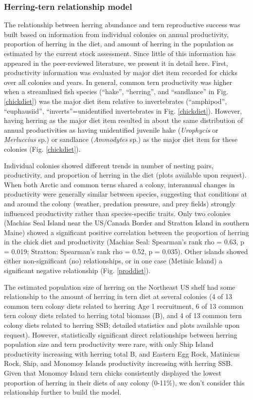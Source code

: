 \documentclass[]{article}
\begin{document}
\subsubsection{Herring-tern relationship
model}\label{herring-tern-relationship-model}

The relationship between herring abundance and tern reproductive success
was built based on information from individual colonies on annual
productivity, proportion of herring in the diet, and amount of herring
in the population as estimated by the current stock assessment. Since
little of this information has appeared in the peer-reviewed literature,
we present it in detail here. First, productivity information was
evaluated by major diet item recorded for chicks over all colonies and
years. In general, common tern productivity was higher when a
streamlined fish species (``hake'', ``herring'', and ``sandlance'' in
Fig. \ref{chickdiet}) was the major diet item relative to invertebrates
(``amphipod'', ``euphausiid'', ``inverts''=unidentified invertebrates in
Fig. \ref{chickdiet}). However, having herring as the major diet item
resulted in about the same distribution of annual productivities as
having unidentified juvenile hake (\emph{Urophycis} or \emph{Merluccius}
sp.) or sandlance (\emph{Ammodytes} sp.) as the major diet item for
these colonies (Fig. \ref{chickdiet}).

Individual colonies showed different trends in number of nesting pairs,
productivity, and proportion of herring in the diet (plots available
upon request). When both Arctic and common terns shared a colony,
interannual changes in productivity were generally similar between
species, suggesting that conditions at and around the colony (weather,
predation pressure, and prey fields) strongly influenced productivity
rather than species-specific traits. Only two colonies (Machias Seal
Island near the US/Canada Border and Stratton Island in southern Maine)
showed a significant positive correlation between the proportion of
herring in the chick diet and productivity (Machias Seal: Spearman's
rank rho = 0.63, p = 0.019; Stratton: Spearman's rank rho = 0.52, p =
0.035). Other islands showed either non-significant (no) relationships,
or in one case (Metinic Island) a significant negative relationship
(Fig. \ref{proddiet}).

The estimated population size of herring on the Northeast US shelf had
some relationship to the amount of herring in tern diet at several
colonies (4 of 13 common tern colony diets related to herring Age 1
recruitment, 6 of 13 common tern colony diets related to herring total
biomass (B), and 4 of 13 common tern colony diets related to herring
SSB; detailed statistics and plots available upon request). However,
statistically significant direct relationships between herring
population size and tern productivity were rare, with only Ship Island
productivity increasing with herring total B, and Eastern Egg Rock,
Matinicus Rock, Ship, and Monomoy Islands productivity increasing with
herring SSB. Given that Monomoy Island tern chicks consistently
displayed the lowest proportion of herring in their diets of any colony
(0-11\%), we don't consider this relationship further to build the
model.
\end{document}
